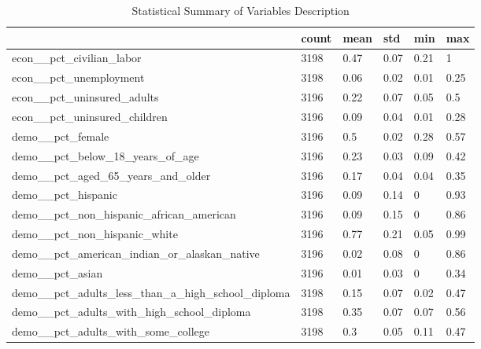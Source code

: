 \begin{table}[]
\small
\begin{adjustwidth}{-.5in}{-.5in}
\caption{Statistical Summary of Variables Description} \label{tab:sum_02}
\begin{tabular}{llllll}
\hline
                                                          & count & mean    & std     & min  & max    \\ \hline
econ\_\_pct\_civilian\_labor                              & 3198  & 0.47    & 0.07    & 0.21 & 1      \\
econ\_\_pct\_unemployment                                 & 3198  & 0.06    & 0.02    & 0.01 & 0.25   \\
econ\_\_pct\_uninsured\_adults                            & 3196  & 0.22    & 0.07    & 0.05 & 0.5    \\
econ\_\_pct\_uninsured\_children                          & 3196  & 0.09    & 0.04    & 0.01 & 0.28   \\ \hline
demo\_\_pct\_female                                       & 3196  & 0.5     & 0.02    & 0.28 & 0.57   \\
demo\_\_pct\_below\_18\_years\_of\_age                    & 3196  & 0.23    & 0.03    & 0.09 & 0.42   \\
demo\_\_pct\_aged\_65\_years\_and\_older                  & 3196  & 0.17    & 0.04    & 0.04 & 0.35   \\
demo\_\_pct\_hispanic                                     & 3196  & 0.09    & 0.14    & 0    & 0.93   \\
demo\_\_pct\_non\_hispanic\_african\_american             & 3196  & 0.09    & 0.15    & 0    & 0.86   \\
demo\_\_pct\_non\_hispanic\_white                         & 3196  & 0.77    & 0.21    & 0.05 & 0.99   \\
demo\_\_pct\_american\_indian\_or\_alaskan\_native        & 3196  & 0.02    & 0.08    & 0    & 0.86   \\
demo\_\_pct\_asian                                        & 3196  & 0.01    & 0.03    & 0    & 0.34   \\
demo\_\_pct\_adults\_less\_than\_a\_high\_school\_diploma & 3198  & 0.15    & 0.07    & 0.02 & 0.47   \\
demo\_\_pct\_adults\_with\_high\_school\_diploma          & 3198  & 0.35    & 0.07    & 0.07 & 0.56   \\
demo\_\_pct\_adults\_with\_some\_college                  & 3198  & 0.3     & 0.05    & 0.11 & 0.47   \\

\end{tabular}
\end{adjustwidth}
\end{table}

